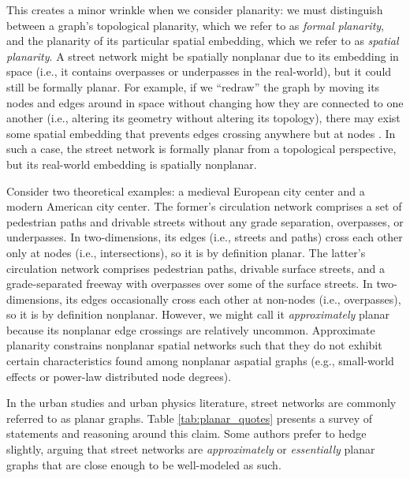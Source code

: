 \documentclass[Afour,sageh,times]{sagej}
\begin{document}
This creates a minor wrinkle when we consider planarity: we must distinguish between a graph's topological planarity, which we refer to as \emph{formal planarity}, and the planarity of its particular spatial embedding, which we refer to as \emph{spatial planarity}. A street network might be spatially nonplanar due to its embedding in space (i.e., it contains overpasses or underpasses in the real-world), but it could still be formally planar. For example, if we \enquote{redraw} the graph by moving its nodes and edges around in space without changing how they are connected to one another (i.e., altering its geometry without altering its topology), there may exist some spatial embedding that prevents edges crossing anywhere but at nodes \citep[for a comprehensive discussion see][pp.~6--10]{barthelemy_morphogenesis_2017}. In such a case, the street network is formally planar from a topological perspective, but its real-world embedding is spatially nonplanar.

Consider two theoretical examples: a medieval European city center and a modern American city center. The former's circulation network comprises a set of pedestrian paths and drivable streets without any grade separation, overpasses, or underpasses. In two-dimensions, its edges (i.e., streets and paths) cross each other only at nodes (i.e., intersections), so it is by definition planar. The latter's circulation network comprises pedestrian paths, drivable surface streets, and a grade-separated freeway with overpasses over some of the surface streets. In two-dimensions, its edges occasionally cross each other at non-nodes (i.e., overpasses), so it is by definition nonplanar. However, we might call it \emph{approximately} planar because its nonplanar edge crossings are relatively uncommon. Approximate planarity constrains nonplanar spatial networks such that they do not exhibit certain characteristics found among nonplanar aspatial graphs (e.g., small-world effects or power-law distributed node degrees).

In the urban studies and urban physics literature, street networks are commonly referred to as planar graphs. Table \ref{tab:planar_quotes} presents a survey of statements and reasoning around this claim. Some authors prefer to hedge slightly, arguing that street networks are \emph{approximately} or \emph{essentially} planar graphs that are close enough to be well-modeled as such.
\end{document}
